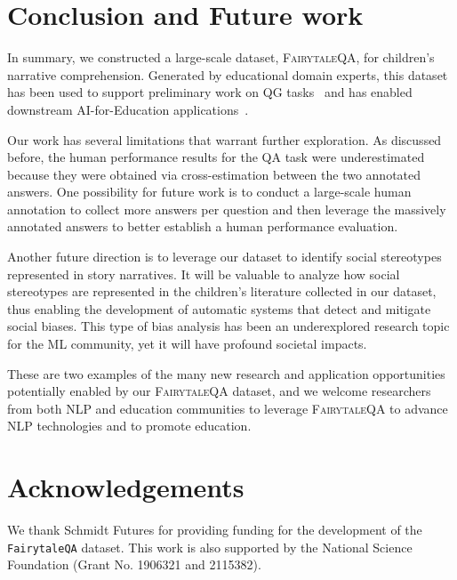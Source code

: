 \documentclass[11pt]{article}
\newcommand{\datasetname}{\textsc{FairytaleQA}\xspace}
\begin{document}
\section{Conclusion and Future work}
In summary, we constructed a large-scale dataset, \datasetname, for children's narrative comprehension. Generated by educational domain experts, this dataset has been used to support preliminary work on QG tasks~\cite{yao2022storybookqag,zhao2022storybookqag} and has enabled downstream AI-for-Education applications~\cite{zhang_storybuddy:_2022,xu2021same}.

Our work has several limitations that warrant further exploration.
As discussed before, the human performance results for the QA task were underestimated because they were obtained via cross-estimation between the two annotated answers. One possibility for future work is to conduct a large-scale human annotation to collect more answers per question and then leverage the massively annotated answers to better establish a human performance evaluation. 

Another future direction is to leverage our dataset to identify social stereotypes represented in story narratives. It will be valuable to analyze how social stereotypes are represented in the children's literature collected in our dataset, thus enabling the development of automatic systems that detect and mitigate social biases. This type of bias analysis has been an underexplored research topic for the ML community, yet it will have profound societal impacts. 

These are two examples of the many new research and application opportunities potentially enabled by our \datasetname dataset, and we welcome researchers from both NLP and education communities to leverage \datasetname to advance NLP technologies and to promote education. 





\section*{Acknowledgements}
We thank Schmidt Futures for providing funding for the development of the \texttt{FairytaleQA} dataset. This work is also supported by the National Science Foundation (Grant No. 1906321 and 2115382). 



\newpage



\end{document}
